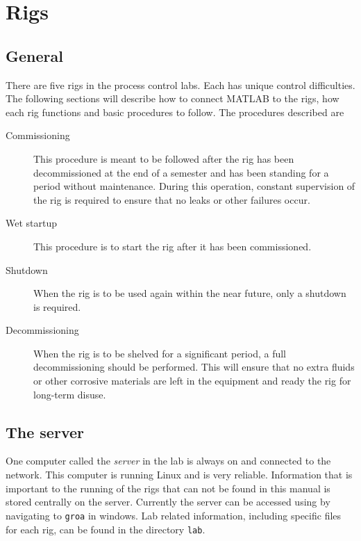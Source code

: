 \chapter{Rigs}
\section{General}
There are five rigs in the process control labs.  Each has unique control difficulties.  The following sections will describe how to connect MATLAB to the rigs, how each rig functions and basic procedures to follow.  The procedures described are
\begin{description}
	\item [Commissioning] This procedure is meant to be followed after the rig has been decommissioned at the end of a semester and has been standing for a period without maintenance.  During this operation, constant supervision of the rig is required to ensure that no leaks or other failures occur.
	\item [Wet startup] This procedure is to start the rig after it has been commissioned.
	\item [Shutdown] When the rig is to be used again within the near future, only a shutdown is required.
	\item [Decommissioning] When the rig is to be shelved for a significant period, a full decommissioning should be performed.  This will ensure that no extra fluids or other corrosive materials are left in the equipment and ready the rig for long-term disuse.
\end{description}

\section{The server}
One computer called the \emph{server} in the lab is always on and connected to the network.  This computer is running Linux and is very reliable.  Information that is important to the running of the rigs that can not be found in this manual is stored centrally on the server.  Currently the server can be accessed using by navigating to \verb|groa| in windows.  Lab related information, including specific files for each rig, can be found in the directory \verb|lab|.

